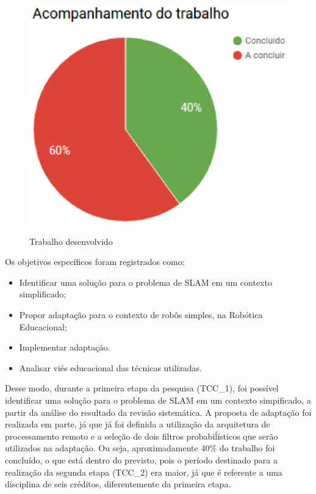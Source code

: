 \begin{figure}[H]
	\centering
	\includegraphics[scale=0.6]{figuras/porcentagem.eps}
	\label{img:porcentagemFinal}
	\caption[Trabalho Desenvolvido]{Trabalho desenvolvido}
\end{figure}

Os objetivos específicos foram registrados como:

\begin{itemize}
	\item Identificar uma solução para o problema de SLAM em um contexto simplificado;
	\item Propor adaptação para o contexto de robôs simples, na Robótica Educacional;
	\item Implementar adaptação.
	\item Analisar viés educacional das técnicas utilizadas.
\end{itemize}

Desse modo, durante a primeira etapa da pesquisa (TCC\_1), foi possível identificar uma solução para o problema de SLAM em um contexto simpificado, a partir da análise do resultado da revisão sistemática. A proposta de adaptação foi realizada em parte, já que já foi definida a utilização da arquitetura de processamento remoto e a seleção de dois filtros probabiĺísticos que serão utilizados na adaptação. Ou seja, aproximadamente 40\% do trabalho foi concluído, o que está dentro do previsto, pois o período destinado para a realização da segunda etapa (TCC\_2) era maior, já que é referente a uma disciplina de seis créditos, diferentemente da primeira etapa.

